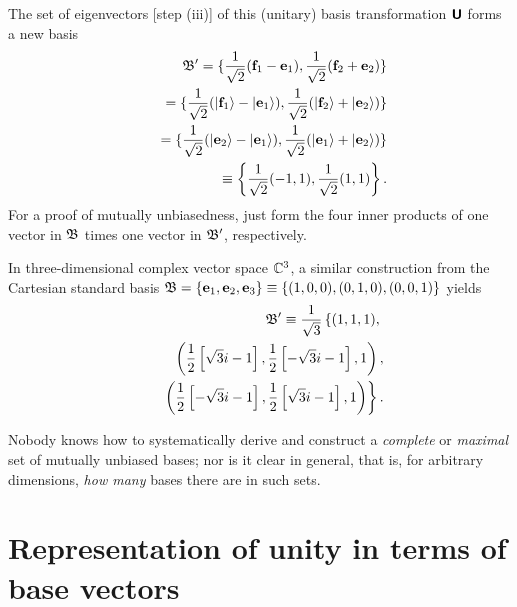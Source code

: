 {\begin{equation}
\end{equation}
The set of eigenvectors [step (iii)] of this  (unitary) basis transformation $\textsf{\textbf{U}}$ forms a new basis
\begin{equation}
\begin{split}
{\frak B}' =
\{ \frac{1}{\sqrt{2}} ({\bf f}_1 - {\bf e}_1),
 \frac{1}{\sqrt{2}}( {\bf f}_2 + {\bf e}_2 )\}
\\
 \qquad =
\{ \frac{1}{\sqrt{2}} (\vert {\bf f}_1\rangle  - \vert {\bf e}_1\rangle ),
 \frac{1}{\sqrt{2}}(\vert  {\bf f}_2 \rangle + \vert {\bf e}_2\rangle  )\}
\\
 \qquad  =
\{ \frac{1}{\sqrt{2}} (\vert {\bf e}_2\rangle  - \vert {\bf e}_1\rangle ),
 \frac{1}{\sqrt{2}}(\vert  {\bf e}_1 \rangle + \vert {\bf e}_2\rangle  )\}
\\
 \qquad \equiv \left\{ \frac{1}{\sqrt{2}}(-1,1),  \frac{1}{\sqrt{2}} (1,1)\right\}.
\end{split}
\end{equation}
For a proof of mutually unbiasedness, just form the four inner products of one vector in ${\frak B}$ times one vector in ${\frak B}'$,
respectively.

In three-dimensional complex vector space ${\Bbb C}^3$, a similar construction
from the Cartesian standard basis
${\frak B}=\{ {\bf e}_1 , {\bf e}_2, {\bf e}_3\} \equiv \{(1,0,0),(0,1,0),(0,0,1)\}$
yields
\begin{equation}
\begin{split}
 {\frak B}' \equiv   \frac{1}{\sqrt{3}}  \left\{
 (1,1,1),\right. \\
\qquad
 \left(\frac{1}{2} \left[{\sqrt{3}} i-1\right] , \frac{1}{2} \left[-{\sqrt{3}} i-1\right] ,
  1\right), \\
\qquad  \left.
 \left(
 \frac{1}{ 2} \left[-{\sqrt{3}} i-1\right], \frac{1}{ 2} \left[{\sqrt{3}} i-1\right],1  \right)
   \right\} .
\end{split}
\end{equation}
\eexample
}

Nobody knows how to systematically derive and construct a {\em complete} or {\em maximal}
set of mutually unbiased bases; nor is it clear in general, that is, for arbitrary dimensions,
{\em how many} bases there are in such sets.


\section{Representation of unity in terms of base vectors}

